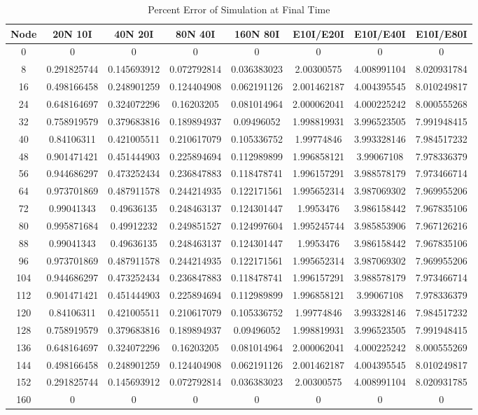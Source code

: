 \documentclass[12pt]{article}
\begin{document}
\begin{table}[ht]
\caption{Percent Error of Simulation at Final Time} %
\centering %
\begin{tabular}{c c c c c c c c} %
\hline\hline %
Node & 20N 10I & 40N 20I & 80N 40I & 160N 80I & E10I/E20I & E10I/E40I & E10I/E80I \\ [0.5ex] %
\hline %
0&	0&	0& 0& 0&	0&	0&	0\\
8&	0.291825744&0.145693912&0.072792814&0.036383023&2.00300575 &4.008991104&8.020931784\\
16&	0.498166458&0.248901259&0.124404908&0.062191126&2.001462187&4.004395545&8.010249817\\
24& 0.648164697&0.324072296&0.16203205 &0.081014964&2.000062041&4.000225242&8.000555268\\
32&	0.758919579&0.379683816&0.189894937&0.09496052 &1.998819931&3.996523505&7.991948415\\
40&	0.84106311 &0.421005511&0.210617079&0.105336752&1.99774846 &3.993328146&7.984517232\\
48&	0.901471421&0.451444903&0.225894694&0.112989899&1.996858121&3.99067108 &7.978336379\\
56&	0.944686297&0.473252434&0.236847883&0.118478741&1.996157291&3.988578179&7.973466714\\
64&	0.973701869&0.487911578&0.244214935&0.122171561&1.995652314&3.987069302&7.969955206\\
72&	0.99041343 &0.49636135 &0.248463137&0.124301447&1.9953476  &3.986158442&7.967835106\\
80&	0.995871684&0.49912232 &0.249851527&0.124997604&1.995245744&3.985853906&7.967126216\\
88&	0.99041343 &0.49636135 &0.248463137&0.124301447&1.9953476  &3.986158442&7.967835106\\
96&	0.973701869&0.487911578&0.244214935&0.122171561&1.995652314&3.987069302&7.969955206\\
104&0.944686297&0.473252434&0.236847883&0.118478741&1.996157291&3.988578179&7.973466714\\
112&0.901471421&0.451444903&0.225894694&0.112989899&1.996858121&3.99067108 &7.978336379\\
120&0.84106311 &0.421005511&0.210617079&0.105336752&1.99774846 &3.993328146&7.984517232\\
128&0.758919579&0.379683816&0.189894937&0.09496052 &1.998819931&3.996523505&7.991948415\\
136&0.648164697&0.324072296&0.16203205 &0.081014964&2.000062041&4.000225242&8.000555269\\
144&0.498166458&0.248901259&0.124404908&0.062191126&2.001462187&4.004395545&8.010249817\\
152&0.291825744&0.145693912&0.072792814&0.036383023&2.00300575 &4.008991104&8.020931785\\
160&0	&0	&0	&0 &0 &0 &0	\\ [1ex] %
\hline %
\end{tabular}
\label{table:nonlin} %
\end{table}
\end{document}

